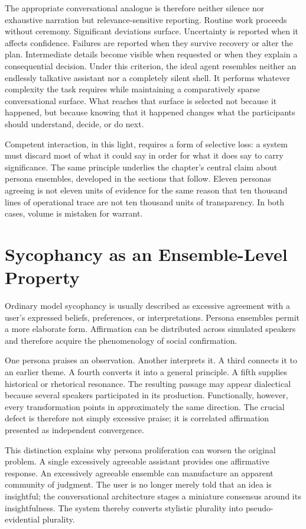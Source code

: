 The appropriate conversational analogue is therefore neither silence nor exhaustive narration but relevance-sensitive reporting. Routine work proceeds without ceremony. Significant deviations surface. Uncertainty is reported when it affects confidence. Failures are reported when they survive recovery or alter the plan. Intermediate details become visible when requested or when they explain a consequential decision. Under this criterion, the ideal agent resembles neither an endlessly talkative assistant nor a completely silent shell. It performs whatever complexity the task requires while maintaining a comparatively sparse conversational surface. What reaches that surface is selected not because it happened, but because knowing that it happened changes what the participants should understand, decide, or do next.

Competent interaction, in this light, requires a form of selective loss: a system must discard most of what it could say in order for what it does say to carry significance. The same principle underlies the chapter's central claim about persona ensembles, developed in the sections that follow. Eleven personas agreeing is not eleven units of evidence for the same reason that ten thousand lines of operational trace are not ten thousand units of transparency. In both cases, volume is mistaken for warrant.

\section{Sycophancy as an Ensemble-Level Property}

Ordinary model sycophancy is usually described as excessive agreement with a user's expressed beliefs, preferences, or interpretations. Persona ensembles permit a more elaborate form. Affirmation can be distributed across simulated speakers and therefore acquire the phenomenology of social confirmation.

One persona praises an observation. Another interprets it. A third connects it to an earlier theme. A fourth converts it into a general principle. A fifth supplies historical or rhetorical resonance. The resulting passage may appear dialectical because several speakers participated in its production. Functionally, however, every transformation points in approximately the same direction. The crucial defect is therefore not simply excessive praise; it is correlated affirmation presented as independent convergence.

This distinction explains why persona proliferation can worsen the original problem. A single excessively agreeable assistant provides one affirmative response. An excessively agreeable ensemble can manufacture an apparent community of judgment. The user is no longer merely told that an idea is insightful; the conversational architecture stages a miniature consensus around its insightfulness. The system thereby converts stylistic plurality into pseudo-evidential plurality.

